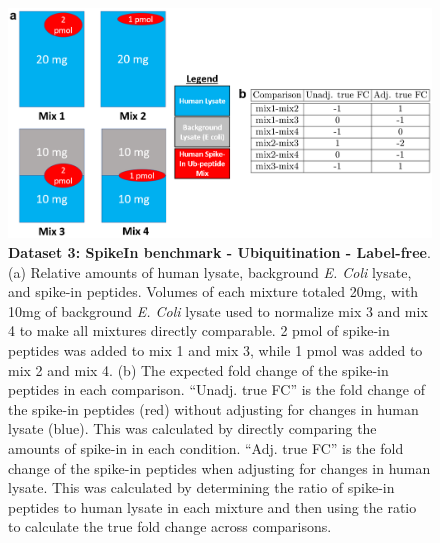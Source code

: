 \documentclass[mcp]{article}
\numberwithin{table}{section}
\begin{document}

\begin{figure}[ht]
\centering
\includegraphics[scale=.5]{images/benchmark_fig.png}
\caption{{\bf Dataset 3: SpikeIn benchmark - Ubiquitination - Label-free}. (a) Relative amounts of human lysate, background {\it E. Coli} lysate, and spike-in peptides. Volumes of each mixture totaled 20mg, with 10mg of background {\it E. Coli} lysate used to normalize mix 3 and mix 4 to make all mixtures directly comparable. 2 pmol of spike-in peptides was added to mix 1 and mix 3, while 1 pmol was added to mix 2 and mix 4. (b) The expected fold change of the spike-in peptides in each comparison. ``Unadj. true FC'' is the fold change of the spike-in peptides (red) without adjusting for changes in human lysate (blue). This was calculated by directly comparing the amounts of spike-in in each condition. ``Adj. true FC'' is the fold change of the spike-in peptides when adjusting for changes in human lysate. This was calculated by determining the ratio of spike-in peptides to human lysate in each mixture and then using the ratio to calculate the true fold change across comparisons.}

\label{fig:benchmark-design}
\end{figure}
\end{document}
